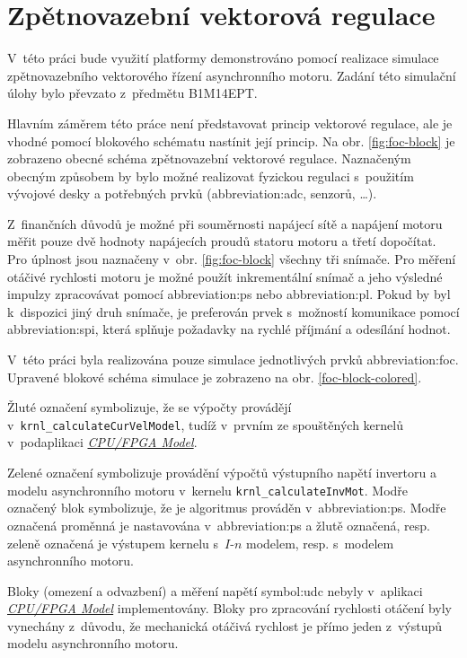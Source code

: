 \documentclass[a4paper, twoside, 11pt]{article}
\begin{document}
\section{Zpětnovazební vektorová regulace}
	V~této práci bude využití platformy demonstrováno pomocí realizace simulace zpětnovazebního vektorového řízení asynchronního motoru. Zadání této simulační úlohy bylo převzato z~předmětu B1M14EPT. \cite{lipcak-bauer-ept-moodle}\par
	Hlavním záměrem této práce není představovat princip vektorové regulace, ale je vhodné pomocí blokového schématu nastínit její princip. Na obr. \ref{fig:foc-block} je zobrazeno obecné schéma zpětnovazební vektorové regulace. Naznačeným obecným způsobem by bylo možné realizovat fyzickou regulaci s~použitím vývojové desky a potřebných prvků (\gls{abbreviation:adc}, senzorů, \dots).\par
	Z~finančních důvodů je možné při souměrnosti napájecí sítě a napájení motoru měřit pouze dvě hodnoty napájecích proudů statoru motoru a třetí dopočítat. Pro úplnost jsou naznačeny v~obr. \ref{fig:foc-block} všechny tři snímače. Pro měření otáčivé rychlosti motoru je možné použít inkrementální snímač a jeho výsledné impulzy zpracovávat pomocí \gls{abbreviation:ps} nebo \gls{abbreviation:pl}. Pokud by byl k~dispozici jiný druh snímače, je preferován prvek s~možností komunikace pomocí \gls{abbreviation:spi}, která splňuje požadavky na rychlé příjmání a odesílání hodnot.\par
	V~této práci byla realizována pouze simulace jednotlivých prvků \gls{abbreviation:foc}. Upravené blokové schéma simulace je zobrazeno na obr. \ref{foc-block-colored}.\par
	\textcolor{ctuyellow}{Žluté označení} symbolizuje, že se výpočty provádějí v~\texttt{krnl\_calculateCurVelModel}, tudíž v~prvním ze spouštěných kernelů v~podaplikaci \hyperref[subsec:cpu-fpga]{\textit{CPU/FPGA Model}}.\par
	\textcolor{ctugreen}{Zelené označení} symbolizuje provádění výpočtů výstupního napětí invertoru a modelu asynchronního motoru v~kernelu \texttt{krnl\_calculateInvMot}. \textcolor{ctublue}{Modře označený} blok symbolizuje, že je algoritmus prováděn v~\gls{abbreviation:ps}. \textcolor{ctublue}{Modře označená} proměnná je nastavována v~\gls{abbreviation:ps} a \textcolor{ctuyellow}{žlutě označená}, resp. \textcolor{ctugreen}{zeleně označená} je výstupem kernelu s~$I$-$n$ modelem, resp. s~modelem asynchronního motoru.\par
	Bloky (omezení a odvazbení) a měření napětí \gls{symbol:udc} nebyly v~aplikaci \hyperref[subsec:cpu-fpga]{\textit{CPU/FPGA Model}} implementovány. Bloky pro zpracování rychlosti otáčení byly vynechány z~důvodu, že mechanická otáčivá rychlost je přímo jeden z~výstupů modelu asynchronního motoru.
\end{document}
